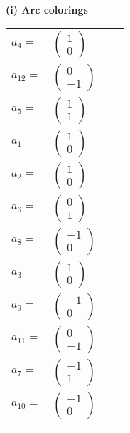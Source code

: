 \documentclass[1p]{elsarticle_modified}
\theoremstyle{definition}
\begin{document}
\flushleft \textbf{(i) Arc colorings}\\
\begin{tabular}{m{7pt} m{180pt} m{7pt} m{180pt} }
\flushright $a_{4}=$&$\begin{pmatrix}1\\0\end{pmatrix}$ \\
\flushright $a_{12}=$&$\begin{pmatrix}0\\-1\end{pmatrix}$ \\
\flushright $a_{5}=$&$\begin{pmatrix}1\\1\end{pmatrix}$ \\
\flushright $a_{1}=$&$\begin{pmatrix}1\\0\end{pmatrix}$ \\
\flushright $a_{2}=$&$\begin{pmatrix}1\\0\end{pmatrix}$ \\
\flushright $a_{6}=$&$\begin{pmatrix}0\\1\end{pmatrix}$ \\
\flushright $a_{8}=$&$\begin{pmatrix}-1\\0\end{pmatrix}$ \\
\flushright $a_{3}=$&$\begin{pmatrix}1\\0\end{pmatrix}$ \\
\flushright $a_{9}=$&$\begin{pmatrix}-1\\0\end{pmatrix}$ \\
\flushright $a_{11}=$&$\begin{pmatrix}0\\-1\end{pmatrix}$ \\
\flushright $a_{7}=$&$\begin{pmatrix}-1\\1\end{pmatrix}$ \\
\flushright $a_{10}=$&$\begin{pmatrix}-1\\0\end{pmatrix}$\\&\end{tabular}
\end{document}
